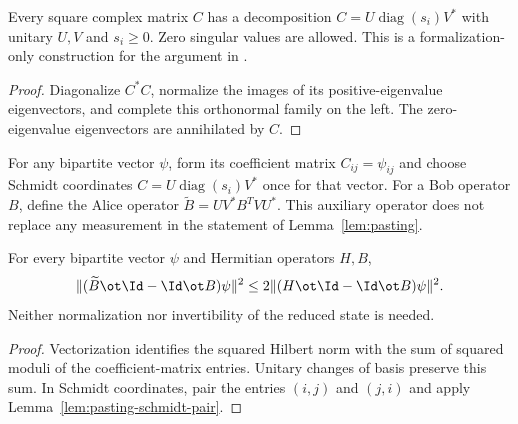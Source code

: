 \begin{lemma}
	\label{lem:pasting-schmidt-coordinates}
	\leanok
	Every square complex matrix $C$ has a decomposition
	$C=U\operatorname{diag}(s_i)V^*$ with unitary $U,V$ and $s_i\geq0$.
	Zero singular values are allowed. This is a formalization-only construction
	for the argument in \cite{gap:qpbt_pasting-product-error}.
\end{lemma}
\begin{proof}
	\leanok
	Diagonalize $C^*C$, normalize the images of its positive-eigenvalue
	eigenvectors, and complete this orthonormal family on the left. The
	zero-eigenvalue eigenvectors are annihilated by $C$.
\end{proof}

\begin{definition}
	\label{def:pasting-schmidt-mirror}
	\leanok
	For any bipartite vector $\psi$, form its coefficient matrix
	$C_{ij}=\psi_{ij}$ and choose Schmidt coordinates
	$C=U\operatorname{diag}(s_i)V^*$ once for that vector. For a Bob operator
	$B$, define the Alice operator
	$\widetilde B=UV^*B^TVU^*$.
	This auxiliary operator does not replace any measurement in the statement
	of Lemma~\ref{lem:pasting}.
\end{definition}

\begin{lemma}
	\label{lem:pasting-schmidt-mirror-norm}
	\leanok
	For every bipartite vector $\psi$ and Hermitian operators $H,B$,
	\[
		\|(\widetilde B\ot\Id-\Id\ot B)\psi\|^2
		\leq 2\|(H\ot\Id-\Id\ot B)\psi\|^2.
	\]
	Neither normalization nor invertibility of the reduced state is needed.
\end{lemma}
\begin{proof}
	\leanok
	Vectorization identifies the squared Hilbert norm with the sum of squared
	moduli of the coefficient-matrix entries. Unitary changes of basis preserve
	this sum. In Schmidt coordinates, pair the entries $(i,j)$ and $(j,i)$
	and apply Lemma~\ref{lem:pasting-schmidt-pair}.
\end{proof}

